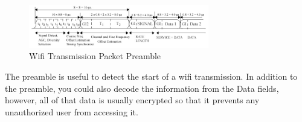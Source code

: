 \begin{figure}[ht]
\centering
\includegraphics[width=0.70\textwidth]{img/ofdm_preamble.jpg}
\caption{Wifi Transmission Packet Preamble}
\label{fig:wifi_preamble}
\end{figure}\par
The preamble is useful to detect the start of a wifi transmission. In addition to the preamble, you could also decode the information from the Data fields, however, all of that data is usually encrypted so that it prevents any unauthorized user from accessing it. \cite{wifi_book}

